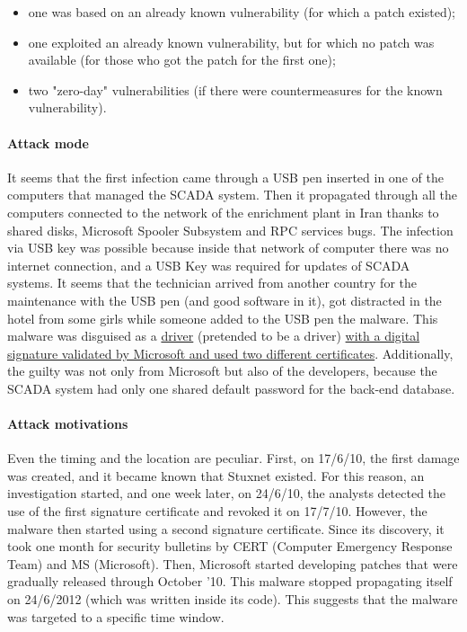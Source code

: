 \begin{itemize}
  \item one was based on an already known vulnerability (for which a patch existed);
  \item one exploited an already known vulnerability, but for which no patch was available (for those who got the patch for the first one);
  \item two "zero-day" vulnerabilities (if there were countermeasures for the known vulnerability).
\end{itemize}

\paragraph{Attack mode}
It seems that the first infection came through a USB pen inserted in one of the computers that managed the
SCADA system. Then it propagated through all the computers connected to the network of the enrichment
plant in Iran thanks to shared disks, Microsoft Spooler Subsystem and RPC services bugs. The infection via
USB key was possible because inside that network of computer there was no internet connection, and a USB
Key was required for updates of SCADA systems. It seems that the technician arrived from another country
for the maintenance with the USB pen (and good software in it), got distracted in the hotel from some girls
while someone added to the USB pen the malware. This malware was disguised as a \ul{driver} (pretended to be a
driver) \ul{with a digital signature validated by Microsoft and used two different certificates}. Additionally, the
guilty was not only from Microsoft but also of the developers, because the SCADA system had only one shared
default password for the back-end database.

\paragraph{Attack motivations}
Even the timing and the location are peculiar. First, on 17/6/10, the first damage was created, and it became known that Stuxnet existed. For this reason, an investigation started, and one week later, on 24/6/10, the analysts detected the use of the first signature certificate and revoked it on 17/7/10. However, the malware then started using a second signature certificate. Since its discovery, it took one month for security bulletins by CERT (Computer Emergency Response Team) and MS (Microsoft). Then, Microsoft started developing patches that were gradually released through October '10. This malware stopped propagating itself on 24/6/2012 (which was written inside its code). This suggests that the malware was targeted to a specific time window.

